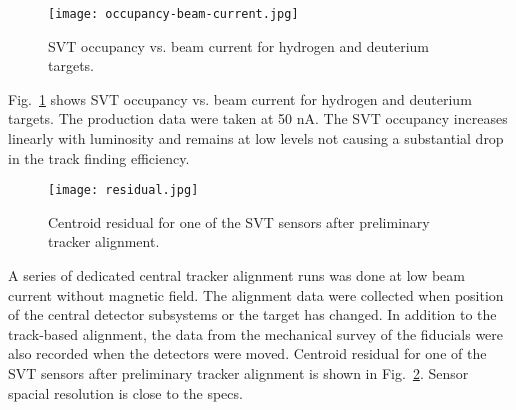 \begin{figure}[hbt] 
\centering 
\texttt{[image: occupancy-beam-current.jpg]}
\caption{SVT occupancy vs. beam current for hydrogen and deuterium targets.}
\label{fig:occupancy-beam-current}
\end{figure}

Fig.~\ref{fig:occupancy-beam-current} shows SVT occupancy vs. beam current for hydrogen and deuterium targets. The production data were taken at 50 nA. The SVT occupancy increases linearly with luminosity and remains at low levels not causing a substantial drop in the track finding efficiency.


\begin{figure}[hbt] 
\centering 
\texttt{[image: residual.jpg]}
\caption{Centroid residual for one of the SVT sensors after preliminary tracker alignment.}
\label{fig:residual}
\end{figure}

A series of dedicated central tracker alignment runs was done at low beam current without magnetic field. The alignment data were collected when position of the central detector subsystems or the target has changed. In addition to the track-based alignment, the data from the mechanical survey of the fiducials were also recorded when the detectors were moved. Centroid residual for one of the SVT sensors after preliminary tracker alignment is shown in Fig.~\ref{fig:residual}. Sensor spacial resolution is close to the specs.
